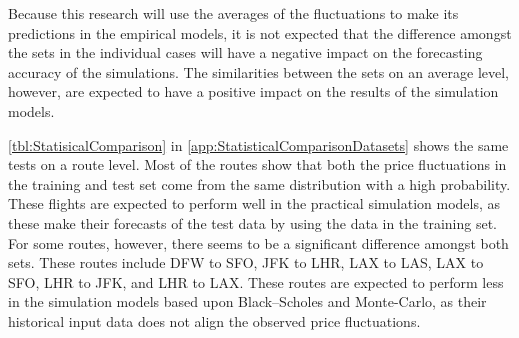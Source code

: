 Because this research will use the averages of the fluctuations to make its predictions in the empirical models, it is not expected that the difference amongst the sets in the individual cases will have a negative impact on the forecasting accuracy of the simulations. The similarities between the sets on an average level, however, are expected to have a positive impact on the results of the simulation models.

\autoref{tbl:StatisicalComparison} in \autoref{app:StatisticalComparisonDatasets} shows the same tests on a route level. Most of the routes show that both the price fluctuations in the training and test set come from the same distribution with a high probability. These flights are expected to perform well in the practical simulation models, as these make their forecasts of the test data by using the data in the training set. For some routes, however, there seems to be a significant difference amongst both sets. These routes include DFW to SFO, JFK to LHR, LAX to LAS, LAX to SFO, LHR to JFK, and LHR to LAX. These routes are expected to perform less in the simulation models based upon Black--Scholes and Monte-Carlo, as their historical input data does not align the observed price fluctuations.


